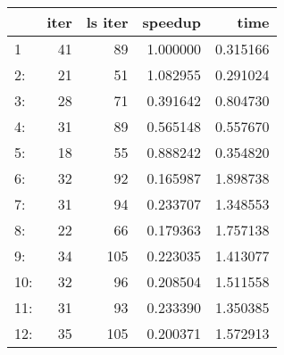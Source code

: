 \begin{tabular}{lrrrr}
\toprule
{} &  iter &  ls iter &   speedup &      time \\
\midrule
1   &    41 &       89 &  1.000000 &  0.315166 \\
2:  &    21 &       51 &  1.082955 &  0.291024 \\
3:  &    28 &       71 &  0.391642 &  0.804730 \\
4:  &    31 &       89 &  0.565148 &  0.557670 \\
5:  &    18 &       55 &  0.888242 &  0.354820 \\
6:  &    32 &       92 &  0.165987 &  1.898738 \\
7:  &    31 &       94 &  0.233707 &  1.348553 \\
8:  &    22 &       66 &  0.179363 &  1.757138 \\
9:  &    34 &      105 &  0.223035 &  1.413077 \\
10: &    32 &       96 &  0.208504 &  1.511558 \\
11: &    31 &       93 &  0.233390 &  1.350385 \\
12: &    35 &      105 &  0.200371 &  1.572913 \\
\bottomrule
\end{tabular}
